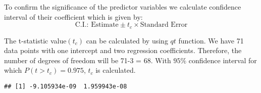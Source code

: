 \documentclass[
]{article}
\newenvironment{Shaded}{\begin{snugshade}}{\end{snugshade}}
\newcommand{\AttributeTok}[1]{\textcolor[rgb]{0.77,0.63,0.00}{#1}}
\newcommand{\CommentTok}[1]{\textcolor[rgb]{0.56,0.35,0.01}{\textit{#1}}}
\newcommand{\DecValTok}[1]{\textcolor[rgb]{0.00,0.00,0.81}{#1}}
\newcommand{\FloatTok}[1]{\textcolor[rgb]{0.00,0.00,0.81}{#1}}
\newcommand{\FunctionTok}[1]{\textcolor[rgb]{0.00,0.00,0.00}{#1}}
\newcommand{\NormalTok}[1]{#1}
\newcommand{\OtherTok}[1]{\textcolor[rgb]{0.56,0.35,0.01}{#1}}
\newcommand{\SpecialCharTok}[1]{\textcolor[rgb]{0.00,0.00,0.00}{#1}}
\begin{document}
To confirm the significance of the predictor variables we calculate
confidence interval of their coefficient which is given by:
\[\textrm{C.I.: Estimate} \pm t_c \times \textrm{Standard Error}\]

The t-statistic value\((t_c)\) can be calculated by using \(qt\)
function. We have 71 data points with one intercept and two regression
coefficients. Therefore, the number of degrees of freedom will be 71-3 =
68. With \(95\%\) confidence interval for which \(P(t > t_c) = 0.975\),
\(t_c\) is calculated.

\begin{Shaded}
\end{Shaded}

\begin{verbatim}
## [1] -9.105934e-09  1.959943e-08
\end{verbatim}

\begin{Shaded}
\end{Shaded}
\end{document}
